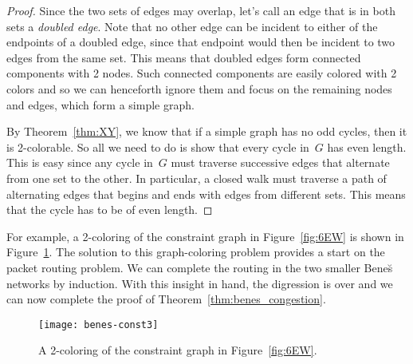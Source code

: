 \begin{proof}
Since the two sets of edges may overlap, let's call an edge that is in
both sets a \emph{doubled edge}.  Note that no other edge can be
incident to either of the endpoints of a doubled edge, since that
endpoint would then be incident to two edges from the same set.  This
means that doubled edges form connected components with 2 nodes.  Such
connected components are easily colored with 2 colors and so we can
henceforth ignore them and focus on the remaining nodes and edges,
which form a simple graph.

By Theorem~\ref{thm:XY}, we know that if a simple graph has no odd
cycles, then it is 2-colorable.  So all we need to do is show that
every cycle in~$G$ has even length.  This is easy since any cycle
in~$G$ must traverse successive edges that alternate from one set to
the other.  In particular, a closed walk must traverse a path of
alternating edges that begins and ends with edges from different sets.
This means that the cycle has to be of even length.
\end{proof}

For example, a 2-coloring of the constraint graph in
Figure~\ref{fig:6EW} is shown in Figure~\ref{fig:6EX}.  The solution
to this graph-coloring problem provides a start on the packet routing
problem.  We can complete the routing in the two smaller Bene\u{s}
networks by induction.  With this insight in hand, the digression is
over and we can now complete the proof of
Theorem~\ref{thm:benes_congestion}.

\begin{figure}


\texttt{[image: benes-const3]}

\caption{A 2-coloring of the constraint graph in
  Figure~\ref{fig:6EW}.}

\label{fig:6EX}

\end{figure}

